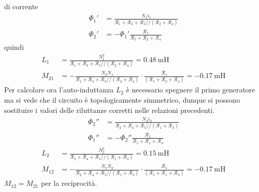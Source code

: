 di corrente
$$
\begin{aligned}
\Phi_1' &= \frac{N_1i_1}{\mathcal{R}_1+\mathcal{R}_3+\mathcal{R}_5//\left(\mathcal{R}_2+\mathcal{R}_4\right)}\\
\Phi_2' &= -\Phi_1' \frac{\mathcal{R}_5}{\mathcal{R}_5+\mathcal{R}_2+\mathcal{R}_4}
\end{aligned}
$$
quindi
$$
\begin{aligned}
L_1 &= \frac{N_1^2}{\mathcal{R}_1 + \mathcal{R}_3 + \mathcal{R}_5//\left(\mathcal{R}_2+\mathcal{R}_4\right)} = \SI{0.48}{\milli\henry}\\
M_{21} &= -\frac{N_2N_1}{\mathcal{R}_1+\mathcal{R}_3+\mathcal{R}_5//\left(\mathcal{R}_2+\mathcal{R}_4\right)}\cdot\frac{\mathcal{R}_5}{\left(\mathcal{R}_5+\mathcal{R}_2+\mathcal{R}_4\right)} = \SI{-0.17}{\milli\henry}
\end{aligned}
$$
Per calcolare ora l'auto-induttanza $L_2$ è necessario spegnere il primo generatore
ma si vede che il circuito è topologicamente simmetrico, dunque si possono sostituire
i valori delle riluttanze corretti nelle relazioni precedenti.
$$\begin{aligned}
\Phi_2'' &= \frac{N_2i_2}{\mathcal{R}_2+\mathcal{R}_4+\mathcal{R}_5//\left(\mathcal{R}_1+\mathcal{R}_3\right)}\\
\Phi_1'' &= -\Phi_2'' \frac{\mathcal{R}_5}{\mathcal{R}_5 + \mathcal{R}_1+\mathcal{R}_3}
\end{aligned}
$$
$$
\begin{aligned}
L_2 &= \frac{N_2^2}{\mathcal{R}_2 + \mathcal{R}_4 +\mathcal{R}_5//\left(\mathcal{R}_1+\mathcal{R}_3\right)} = \SI{0.15}{\milli\henry}\\
M_{12} &= - \frac{N_1N_2}{\mathcal{R}_2+\mathcal{R}_4+\mathcal{R}_5//\left(\mathcal{R}_1+\mathcal{R}_3\right)}\cdot\frac{\mathcal{R}_5}{\left(\mathcal{R}_5+\mathcal{R}_1+\mathcal{R}_3\right)} = \SI{-0.17}{\milli\henry}
\end{aligned}
$$
$M_{12}=M_{21}$ per la reciprocità.

\newpage
